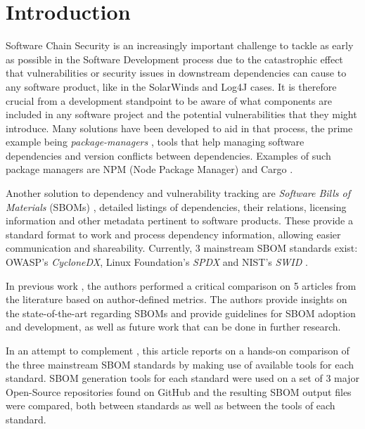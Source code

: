 \section{Introduction}

Software Chain Security is an increasingly important challenge to tackle as early as possible in the Software Development process due to the catastrophic effect that vulnerabilities or security issues in downstream dependencies can cause to any software product, like in the SolarWinds \cite{SolarWinds} and Log4J \cite{logj4} cases. It is therefore crucial from a development standpoint to be aware of what components are included in any software project and the potential vulnerabilities that they might introduce.
Many solutions have been developed to aid in that process, the prime example being \emph{package-managers} \cite{article:package-manager}, tools that help managing software dependencies and version conflicts between dependencies. Examples of such package managers are NPM (Node Package Manager) and Cargo \cite{tools:pkg-mngr:npm,tools:pkg-mngr:cargo}.

Another solution to dependency and vulnerability tracking are \emph{Software Bills of Materials} (SBOMs) \cite{article:concept:sbom-2}, detailed listings of dependencies, their relations, licensing information and other metadata pertinent to software products. These provide a standard format to work and process dependency information, allowing easier communication and shareability.
Currently, 3 mainstream SBOM standards exist: OWASP's \emph{CycloneDX}, Linux Foundation's \emph{SPDX} and NIST's \emph{SWID} \cite{standards:sbom:cyclonedx,standards:sbom:spdx,standards:sbom:swid}.

In previous work \cite{article:concept:sbom-sota-review}, the authors performed a critical comparison on 5 articles from the literature \cite{article:business-sbom,article:software-bom,article:sbom-required,article:sbom-study,article:sboms-issues-solutions} based on author-defined metrics. The authors provide insights on the state-of-the-art regarding SBOMs and provide guidelines for SBOM adoption and development, as well as future work that can be done in further research.

In an attempt to complement \cite{article:concept:sbom-sota-review}, this article reports on a hands-on comparison of the three mainstream SBOM standards by making use of available tools for each standard. SBOM generation tools for each standard were used on a set of 3 major Open-Source repositories found on GitHub and the resulting SBOM output files were compared, both between standards as well as between the tools of each standard.